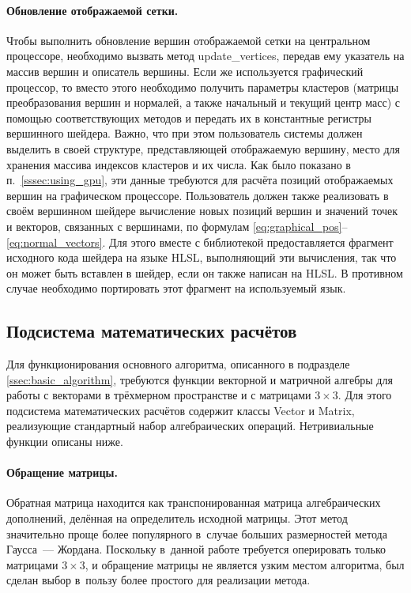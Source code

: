 \documentclass[a4paper, 14pt, titlepage]{extarticle}
\begin{document}
        \paragraph{Обновление отображаемой сетки.}
        Чтобы выполнить обновление вершин отображаемой сетки на центральном процессоре, необходимо вызвать метод
        update\_vertices, передав ему указатель на массив вершин и описатель вершины.
        Если же используется графический процессор, то вместо этого необходимо
        получить параметры кластеров (матрицы преобразования вершин и нормалей, а также начальный и
        текущий центр масс) с помощью соответствующих методов и передать их в константные регистры
        вершинного шейдера. Важно, что при этом пользователь системы должен выделить в своей структуре,
        представляющей отображаемую вершину, место для хранения массива индексов кластеров и их
        числа. Как было показано в п.~\ref{sssec:using_gpu}, эти данные требуются для расчёта
        позиций отображаемых вершин на графическом процессоре. Пользователь должен также реализовать
        в своём вершинном шейдере вычисление новых позиций вершин и значений точек и векторов,
        связанных с вершинами, по формулам \eqref{eq:graphical_pos}--\eqref{eq:normal_vectors}.
        Для этого вместе с библиотекой предоставляется фрагмент исходного кода шейдера на языке HLSL,
        выполняющий эти вычисления, так что он может быть вставлен в шейдер, если он также написан
        на HLSL. В противном случае необходимо портировать этот фрагмент на используемый язык.

    \subsection{Подсистема математических расчётов}\label{sssec:math}

        Для функционирования основного алгоритма, описанного в подразделе \ref{ssec:basic_algorithm}, требуются
        функции векторной и матричной алгебры для работы с векторами в трёхмерном пространстве и с
        матрицами $3 \times 3$. Для этого подсистема математических расчётов содержит
        классы Vector и Matrix, реализующие стандартный набор алгебраических операций. Нетривиальные
        функции описаны ниже.

        \paragraph{Обращение матрицы.}
        Обратная матрица находится как транспонированная матрица алгебраических дополнений, делённая
        на определитель исходной матрицы. Этот метод значительно проще более популярного в~случае
        больших размерностей метода Гаусса~--- Жордана. Поскольку в~данной работе требуется
        оперировать только матрицами $3 \times 3$, и обращение матрицы не является узким местом
        алгоритма, был сделан выбор в~пользу более простого для реализации метода.
\end{document}
